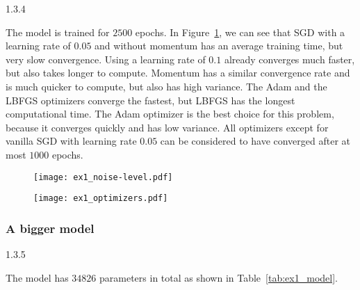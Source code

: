 \begin{task}{1.3.4}
\end{task}

The model is trained for $2500$ epochs. In Figure~\ref{fig:ex1_optimizers}, we can see that SGD with
a learning rate of $0.05$ and without momentum has an average training time, but very slow
convergence. Using a learning rate of $0.1$ already converges much faster, but also takes longer to
compute. Momentum has a similar convergence rate and is much quicker to compute, but also has high
variance. The Adam and the LBFGS optimizers converge the fastest, but LBFGS has the longest
computational time. The Adam optimizer is the best choice for this problem, because it converges
quickly and has low variance. All optimizers except for vanilla SGD with learning rate $0.05$ can
be considered to have converged after at most $1000$ epochs.

\begin{figure}[ht!]
  \centering
  \begin{minipage}{0.48\textwidth}
    \centering
    \texttt{[image: ex1\_noise-level.pdf]}
    \label{fig:ex1_noise-level}
  \end{minipage}
  \begin{minipage}{0.48\textwidth}
    \centering
    \texttt{[image: ex1\_optimizers.pdf]}
    \label{fig:ex1_optimizers}
  \end{minipage}
\end{figure}


\subsubsection*{A bigger model}
\begin{task}{1.3.5}
\end{task}

The model has $34826$ parameters in total as shown in Table~\ref{tab:ex1_model}.

